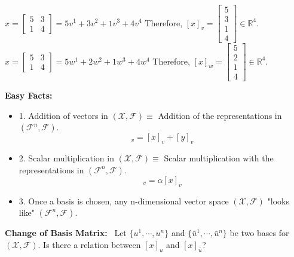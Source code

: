\documentclass[letterpaper]{article}
\begin{document}
     $x=\left[\begin{array}{cc}
        5 & 3\\
        1 & 4
        \end{array}\right]=5v^{1}+3v^{2}+1v^{3}+4v^{4}$
    \newline
    Therefore, $\left[x\right]_v=\left[\begin{array}{c}
        5\\
        3\\
        1\\
        4
    \end{array}\right]\in \mathbb{R}^4$. \\
    $x=\left[\begin{array}{cc}
        5 & 3\\
        1 & 4
        \end{array}\right]=5w^{1}+2w^{2}+1w^{3}+4w^{4}$
    \newline
    Therefore, $\left[x\right]_w=\left[\begin{array}{c}
        5\\
        2\\
        1\\
        4
    \end{array}\right]\in \mathbb{R}^4$.

\noindent \textbf{Easy Facts:}~
    \begin{itemize}
        \item[] 1. Addition of vectors in $(\mathcal{X},\mathcal{F}) \equiv$ Addition of the representations in $(\mathcal{F}^n,\mathcal{F})$.
        \begin{equation*}
            [x+y]_v=[x]_v+[y]_v
        \end{equation*}
        \item[] 2. Scalar multiplication in $(\mathcal{X},\mathcal{F}) \equiv$ Scalar multiplication with the representations in $(\mathcal{F}^n,\mathcal{F})$.
        \begin{equation*}
            [\alpha x]_v=\alpha[x]_v
        \end{equation*}
        \item[] 3. Once a basis is chosen, any n-dimensional vector space $(\mathcal{X},\mathcal{F})$ "looks like" $(\mathcal{F}^n,\mathcal{F})$.
    \end{itemize}

\textbf{Change of Basis Matrix:}~ Let $\{u^1, \dotsb, u^n\}$ and $\{\bar{u}^1, \dotsb, \bar{u}^n\}$ be two bases for $(\mathcal{X},\mathcal{F})$. Is there a relation between $[x]_u$ and $[x]_{\bar{u}}$?
\end{document}
